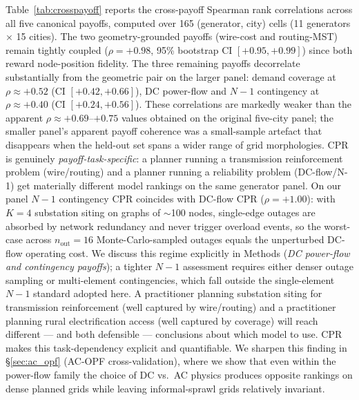 \documentclass[10pt,a4paper]{article}
\begin{document}
Table~\ref{tab:crosspayoff} reports the cross-payoff Spearman rank
correlations across all five canonical payoffs, computed over 165
(generator, city) cells (11 generators $\times$ 15 cities).
The two geometry-grounded payoffs (wire-cost and routing-MST)
remain tightly coupled ($\rho = +0.98$, 95\% bootstrap CI
$[+0.95, +0.99]$) since both reward node-position fidelity. The
three remaining payoffs decorrelate substantially from the
geometric pair on the larger panel: demand coverage at
$\rho \approx +0.52$ (CI $[+0.42, +0.66]$), DC power-flow and
$N\!-\!1$ contingency at $\rho \approx +0.40$ (CI $[+0.24, +0.56]$).
These correlations are markedly weaker than the apparent
$\rho \approx +0.69$--$+0.75$ values obtained on the original
five-city panel; the smaller panel's apparent payoff coherence
was a small-sample artefact that disappears when the held-out set
spans a wider range of grid morphologies. CPR is genuinely
\emph{payoff-task-specific}: a planner running a transmission
reinforcement problem (wire/routing) and a planner running a
reliability problem (DC-flow/N-1) get materially different model
rankings on the same generator panel.
On our panel $N\!-\!1$ contingency CPR coincides with DC-flow CPR
($\rho = +1.00$): with $K = 4$ substation siting on graphs of
$\sim$100 nodes, single-edge outages are absorbed by network
redundancy and never trigger overload events, so the worst-case
across $n_{\mathrm{out}} = 16$ Monte-Carlo-sampled outages equals
the unperturbed DC-flow operating cost. We discuss this regime explicitly in Methods
(\textit{DC power-flow and contingency payoffs}); a tighter
$N\!-\!1$ assessment requires either denser outage sampling or
multi-element contingencies, which fall outside the
single-element $N\!-\!1$ standard adopted here. A practitioner
planning substation siting for transmission reinforcement (well
captured by wire/routing) and a practitioner planning rural
electrification access (well captured by coverage) will reach
different --- and both defensible --- conclusions about which
model to use. CPR makes this task-dependency explicit and
quantifiable. We sharpen this finding in
§\ref{sec:ac_opf} (AC-OPF cross-validation), where we show that
even within the power-flow family the choice of DC vs.\ AC physics
produces opposite rankings on dense planned grids while leaving
informal-sprawl grids relatively invariant.

\begin{table}[h]
\centering
\caption{\textbf{Table 1\,\textbar} Cross-payoff Spearman rank
correlations for generator CPR rankings, computed across 165
(generator, city) cells (11 generators $\times$ 15 cities).
Wire-cost and routing-MST agree closely; coverage, DC-flow, and
$N\!-\!1$ each carry partially distinct ranking information. The
$N\!-\!1$--DC-flow row pair coincides on our panel because our
sampled graphs absorb single-edge outages without triggering
overloads; we document this regime in Methods.}
\label{tab:crosspayoff}

\end{table}
\end{document}
